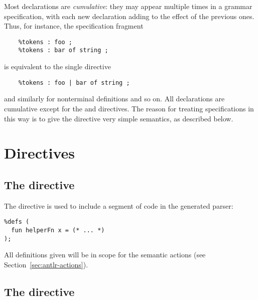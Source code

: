 Most \antlr{} declarations are \emph{cumulative}: they may appear multiple times in a grammar specification, with each new declaration adding to the effect of the previous ones.  Thus, for instance, the specification fragment
\begin{verbatim}
    %tokens : foo ;
    %tokens : bar of string ;
\end{verbatim}
is equivalent to the single directive
\begin{verbatim}
    %tokens : foo | bar of string ;
\end{verbatim}
and similarly for nonterminal definitions and so on.  All declarations are cumulative except for the  and  directives.
The reason for treating specifications in this way is to give the  directive very simple semantics, as described below.

\section{Directives}

\subsection{The  directive}

The  directive is used to include a segment of code in the generated parser:  
\begin{lstlisting}
%defs (
  fun helperFn x = (* ... *)
);
\end{lstlisting}
All definitions given will be in scope for the semantic actions (see Section~\ref{sec:antlr-actions}).

\subsection{The  directive}

